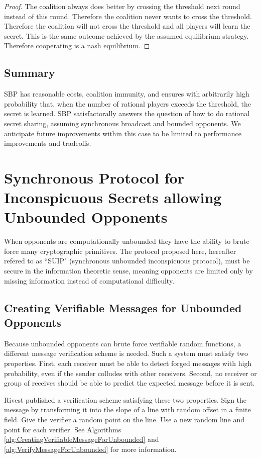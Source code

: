 \documentclass{dalcsthesis}
\begin{document}
\begin{proof}
The coalition always does better by crossing the threshold next round instead of this round. Therefore the coalition never wants to cross the threshold. Therefore the coalition will not cross the threshold and all players will learn the secret. This is the same outcome achieved by the assumed equilibrium strategy. Therefore cooperating is a nash equilibrium.
\end{proof}

\subsection{Summary}

SBP has reasonable costs, coalition immunity, and ensures with arbitrarily high probability that, when the number of rational players exceeds the threshold, the secret is learned. SBP satisfactorally answers the question of how to do rational secret sharing, assuming synchronous broadcast and bounded opponents. We anticipate future improvements within this case to be limited to performance improvements and tradeoffs.

\section{Synchronous Protocol for Inconspicuous Secrets allowing Unbounded Opponents}

When opponents are computationally unbounded they have the ability to brute force many cryptographic primitives. The protocol proposed here, hereafter refered to as ``SUIP" (synchronous unbounded inconspicuous protocol), must be secure in the information theoretic sense, meaning opponents are limited only by missing information instead of computational difficulty.

\subsection{Creating Verifiable Messages for Unbounded Opponents}
\label{sec:vermes}

Because unbounded opponents can brute force verifiable random functions, a different message verification scheme is needed. Such a system must satisfy two properties. First, each receiver must be able to detect forged messages with high probability, even if the sender colludes with other receivers. Second, no receiver or group of receives should be able to predict the expected message before it is sent.

Rivest \cite{rivest99} published a verification scheme satisfying these two properties. Sign the message by transforming it into the slope of a line with random offset in a finite field. Give the verifier a random point on the line. Use a new random line and point for each verifier. See Algorithms \ref{alg:CreatingVerifiableMessageForUnbounded} and \ref{alg:VerifyMessageForUnbounded} for more information.
\end{document}
